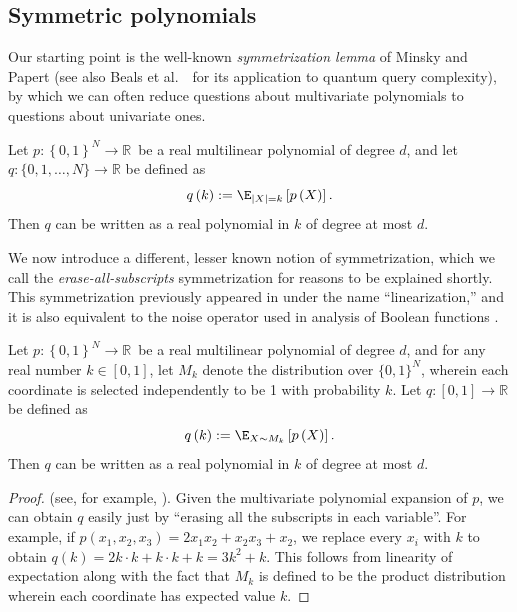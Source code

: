 %
\subsection{Symmetric polynomials}

Our starting point is the well-known \textit{symmetrization lemma} of Minsky
and Papert \cite{mp} (see also Beals et al.\ \cite{bbcmw}\ for its
application to quantum query complexity), by which we can often reduce
questions about multivariate polynomials to questions about univariate ones.

\begin{lemma}
\label{symlem} Let $p:\left\{ 0,1\right\} ^{N}\rightarrow\mathbb{R}$\ be a
real multilinear polynomial of degree $d$, and let $q:\{0,1,\ldots,N\}\to
\mathbb{R}$ be defined as
\begin{equation}
q\left( k\right) :=\E_{\left\vert X\right\vert =k}\left[ p\left( X\right) 
\right] .
\end{equation}
Then $q$ can be written as a real polynomial in $k$ of degree at most $d$.
\end{lemma}

We now introduce a different, lesser known
notion of symmetrization, 
which we call the \emph{erase-all-subscripts} symmetrization
for reasons to be explained shortly. This symmetrization previously appeared in \cite{shi} under the name ``linearization,'' and it is also equivalent to the noise operator used in analysis of Boolean functions \cite[Definition 2.46]{odonnell}.

\begin{lemma}
Let $p:\left\{ 0,1\right\} ^{N}\rightarrow\mathbb{R}$\ be a
real multilinear polynomial of degree $d$,
and for
any real number $k \in [0, 1]$,
let $M_{k}$ denote
the distribution over $\{0, 1\}^N$, wherein each coordinate is selected
independently to be 1 with probability $k$.
Let $q:[0, 1] \to
\mathbb{R}$ be defined as
\begin{equation}
q\left( k\right) :=\E_{X \sim M_{k}}\left[ p\left( X\right) 
\right] .
\end{equation}
Then $q$ can be written as a real polynomial in $k$ of degree at most $d$.
\label{lem:eraseallsubscripts}
\end{lemma}
\begin{proof} (see, for example, \cite[Proof of Theorem 3]{STT12}).
Given the multivariate polynomial expansion of $p$,
we can obtain $q$ easily just by ``erasing all the subscripts in each variable''. For example, if
$p(x_1, x_2, x_3)= 2 x_1 x_2 + x_2 x_3 + x_2$, we replace every $x_i$ with $k$ to obtain
$q(k)=2k\cdot k+ k\cdot k + k=3k^2 + k$.
This follows from linearity of expectation along with the fact that $M_k$
is defined to be the
product distribution wherein
each coordinate has expected value $k$.
\end{proof}

